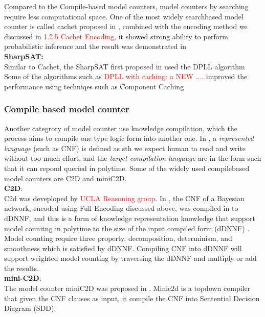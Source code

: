     Compared to the Compile-based model counters, model counters by searching require less computational space. One of the most widely search\-based model counter is called cachet proposed in \cite{Cachet}, combined with the encoding method we discussed in \textcolor{red}{1.2.5 Cachet Encoding}, it showed strong ability to perform probabilistic inference and the result was demonstrated in \cite{Sang:2005:PBI:1619332.1619409}\\
    
    \noindent \textbf{SharpSAT:}\\
    Similar to Cachet, the SharpSAT first proposed in \cite{Sharp-SAT2006} used the DPLL algorithm \\
    Some of the algorithms such as \textcolor{red}{DPLL with caching: a NEW ....} improved the performance using techniqes such as Component Caching
    \subsubsection{Compile based model counter}
    Another categrory of model counter use knowledge compilation, which the process aims to compile one type logic form into another one.\cite{2008-literature-review} In \cite{2002language-map}, a \textit{represented language} (such as CNF) is defined as sth we expect human to read and write without too much effort, and the \textit{target compilation langauge} are in the form such that it can repond queried in poly\-time. Some of the widely used compile\-based model counters are C2D and miniC2D.\\
    
    \textbf{C2D}:\\
    C2d was deveploped by \textcolor{red}{UCLA Reasoning group}. In \cite{c2d}, the CNF of a Bayesian network, encoded using Full Encoding discussed above, was compiled in to d\-DNNF, and this is a form of knowledge representation knowledge that support model counitng in poly\-time to the size of the input compiled form (d\-DNNF) \cite{2002language-map}.\\
    
    Model counting require three property, decomposition, determinism, and smoothness which is satisfied by d\-DNNF. Compiling CNF into d\-DNNF will support weighted model counting by traversing the d\-DNNF and multiply or add the results.\\
    
    \textbf{mini-C2D}:\\
    The model counter mini\-C2D was proposed in \cite{minic2d}. Minic2d is a top\-down compiler that given the CNF clauses as input, it compile the CNF into Sentential Decision Diagram (SDD).\\
    
